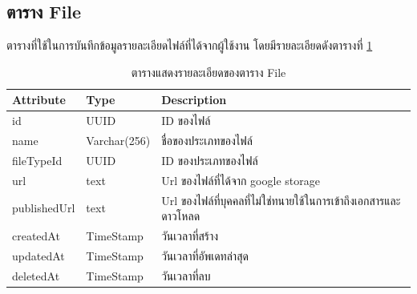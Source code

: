 \documentclass[12pt,oneside,openright,a4paper]{cpe-thai-project}
\begin{document}
\newpage
\subsection{ตาราง File}
ตารางที่ใช้ในการบันทึกข้อมูลรายละเอียดไฟล์ที่ได้จากผู้ใช้งาน โดยมีรายละเอียดดังตารางที่ \ref{tbl:dbFile}
\begin{table}[!ht]
    \centering
    \begin{tabular}{|p{4cm}|p{2cm}|p{6cm}|}
    \hline
    \textbf{Attribute} & \textbf{Type} & \textbf{Description}   \\ \hline
    id                 & UUID          & ID ของไฟล์                                                      \\ \hline
    name               & Varchar(256)   & ชื่อของประเภทของไฟล์                                            \\ \hline
    fileTypeId         & UUID          & ID ของประเภทของไฟล์                                             \\ \hline
    url                & text          & Url ของไฟล์ที่ได้จาก google storage                             \\ \hline
    publishedUrl       & text          & Url ของไฟล์ที่บุคคลที่ไม่ใช่ทนายใช้ในการเข้าถึงเอกสารและดาวโหลด \\ \hline
    createdAt          & TimeStamp     & วันเวลาที่สร้าง                                                 \\ \hline
    updatedAt          & TimeStamp     & วันเวลาที่อัพเดทล่าสุด                                          \\ \hline
    deletedAt          & TimeStamp     & วันเวลาที่ลบ                                                    \\ \hline
    \end{tabular}
    \caption{\centering  ตารางแสดงรายละเอียดของตาราง File} \label{tbl:dbFile}
\end{table}
\end{document}
